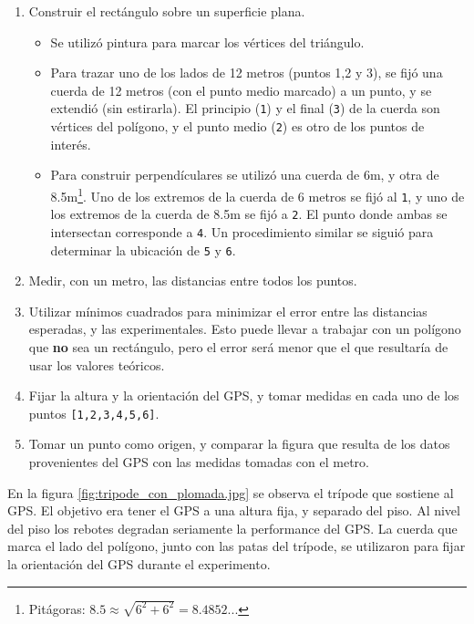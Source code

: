\documentclass[spanish,12pt,a4paper,titlepage]{report}
\begin{document}
\begin{enumerate}
\item Construir el rectángulo sobre un superficie plana.
  \begin{itemize}
  \item Se utilizó pintura para marcar los vértices del triángulo.
  \item Para trazar uno de los lados de 12 metros (puntos 1,2 y 3), se fijó una cuerda de 12 metros (con el punto medio marcado) a un punto, y se extendió (sin estirarla). El principio (\verb+1+) y el final (\verb+3+) de la cuerda son vértices del polígono, y el punto medio (\verb+2+) es otro de los puntos de interés.
  \item Para construir perpendículares se utilizó una cuerda de 6m, y otra de 8.5m\footnote{Pitágoras: $8.5 \approx \sqrt{6^2 + 6^2} = 8.4852...$}. Uno de los extremos de la cuerda de 6 metros se fijó al \verb+1+, y uno de los extremos de la cuerda de 8.5m se fijó a \verb+2+. El punto donde ambas se intersectan corresponde a \verb+4+. Un procedimiento similar se siguió para determinar la ubicación de \verb+5+ y \verb+6+.
  \end{itemize}
\item Medir, con un metro, las distancias entre todos los puntos.
\item Utilizar mínimos cuadrados para minimizar el error entre las distancias esperadas, y las experimentales. Esto puede llevar a trabajar con un polígono que \textbf{no} sea un rectángulo, pero el error será menor que el que resultaría de usar los valores teóricos.
\item Fijar la altura y la orientación del GPS, y tomar medidas en cada uno de los puntos \verb+[1,2,3,4,5,6]+.
\item Tomar un punto como origen, y comparar la figura que resulta de los datos provenientes del GPS con las medidas tomadas con el metro.
\end{enumerate}

En la figura \ref{fig:tripode_con_plomada.jpg} se observa el trípode que sostiene al GPS. El objetivo era tener el GPS a una altura fija, y separado del piso. Al nivel del piso los rebotes degradan seriamente la performance del GPS. La cuerda que marca el lado del polígono, junto con las patas del trípode, se utilizaron para fijar la orientación del GPS durante el experimento.
\end{document}
